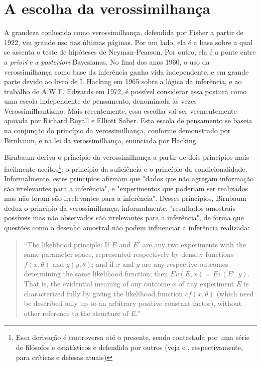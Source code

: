 \section{A escolha da verossimilhança}\label{sec:likelihood}

A grandeza conhecida como verossimilhança, defendida por Fisher a partir de 1922, viu grande uso nas últimas páginas. Por um lado,
ela é a base sobre a qual se assenta o teste de hipóteses de Neyman-Pearson. Por outro, ela é a ponte entre a {\em priori}
e a {\em posteriori} Bayesianas. No final dos anos 1960, o uso da verossimilhança como base da inferência ganha vida 
independente, e em grande parte devido ao livro de I. Hacking em 1965 sobre a lógica da inferência, 
e ao trabalho de A.W.F. Edwards em 1972, é possível considerar essa postura como
uma escola independente de pensamento, denominada às vezes Verossimilhantismo. Mais recentemente, essa escolha vai ser
veementemente apoiada por Richard Royall e Elliott Sober. Esta escola de pensamento se baseia na conjunção do princípio da 
verossimilhança, conforme demonstrado por Birnbaum, e na lei da verossimilhança, enunciada por Hacking.

Birnbaum deriva o princípio da verossimilhança a partir de dois princípios mais facilmente aceitos\footnote{
Essa derivação é controversa até o presente, sendo contestada por uma série de filósofos e estatísticos 
e defendida por outros (veja \citep{Mayo10} e \citep{Gandenberger12}, respectivamente, para críticas e defesas
atuais)}: o princípio da suficiência e o princípio da condicionalidade. Informalmente, estes princípios afirmam que
"dados que não agregam informação são irrelevantes para a inferência", e "experimentos que poderiam ser realizados
mas não foram são irrelevantes para a inferência". Desses princípios, Birnbaum deduz o princípio da verossimilhança,
informalmente, "resultados amostrais possíveis mas não observados são irrelevantes para a inferência", de forma 
que questões como o desenho amostral não podem influenciar a inferência realizada: 

\begin{quote}
``The likelihood principle: If $E$ and $E\prime$ are any two experiments with the same parameter space,
 represented respectively by density functions $f(x, \theta)$ and $g(y, \theta)$; and if $x$ and $y$ are
 any respective outcomes determining the same likelihood function; then $Ev(E, x) = Ev(E\prime, y)$.
 That is, the evidential meaning of any outcome $x$ of any experiment $E$ is characterized fully by giving
 the likelihood function $cf(x, \theta)$ (which need be described only up to an arbitrary positive constant
 factor), without other reference to the structure of $E$.''
\citep{Birnbaum62}
\end{quote}

